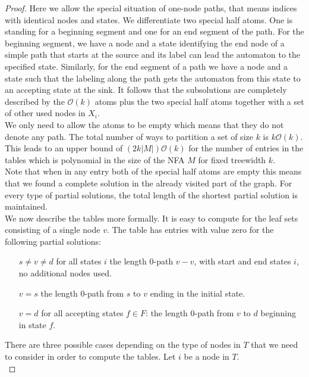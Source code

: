 \documentclass[]{article}
\numberwithin{equation}{section}
\begin{document}
\begin{proof}
	Here we allow the special situation of one-node paths, that means indices with identical nodes and states. We differentiate two special half atoms. One is standing for a beginning segment and one for an end segment of the path. For the beginning segment, we have a node and a state identifying the end node of a simple path that starts at the source and its label can lead the automaton to the specified state. Similarly, for the end segment of a path we have a node and a state such that the labeling along the path gets the automaton from this state to an accepting state at the sink. It follows that the subsolutions are completely described by the $\mathcal{O}(k)$ atoms plus the two special half atoms together with a set of other used nodes in $X_i$.\\
	
	We only need to allow the atoms to be empty which means that they do not denote any path. The total number of ways to partition a set of size $k$ is $k\mathcal{O}(k)$. This leads to an upper bound of $(2k|M|)\mathcal{O}(k)$ for the number of entries in the tables which is polynomial in the size of the NFA $M$ for fixed treewidth $k$.\\
	
	Note that when in any entry both of the special half atoms are empty this means that we found a complete solution in the already visited part of the graph. For every type of partial solutions, the total length of the shortest partial solution is maintained.\\
	
	We now describe the tables more formally. It is easy to compute for the leaf sets consisting of a single node $v$. The table has entries with value zero for the following partial solutions:
	
	\begin{enumerate}[label=[$s\neq v\neq d$,leftmargin=*]
		\item[$s\neq v\neq d$] for all states $i$ the length $0$-path $v-v$, with start and end states $i$, no additional nodes used.
		\item[$v = s$] the length $0$-path from $s$ to $v$ ending in the initial state.
		\item[$v = d$] for all accepting states $f\in F$: the length $0$-path from $v$ to $d$ beginning in state $f$.
	\end{enumerate}
	
	There are three possible cases depending on the type of nodes in $T$ that we need to consider in order to compute the tables. Let $i$ be a node in $T$.\\
	

\end{proof}
\end{document}
